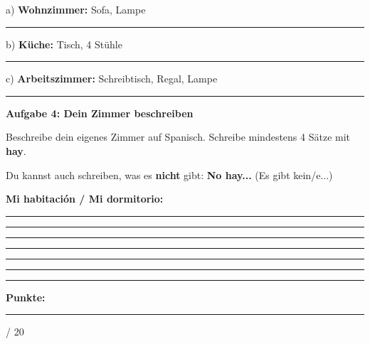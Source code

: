 \documentclass[11pt, a4paper]{article}
\newcommand{\fachfarbe}{spanisch}
\newcommand{\maxpunkte}{20}
\newcommand{\punktebox}[1]{\hfill\fbox{\small \_/#1}}
\newcommand{\luecke}[1]{\rule{#1}{0.4pt}}
\newenvironment{aufgabe}[1]{%
    \needspace{5\baselineskip}%
    \nopagebreak[4]%
    \vspace{10pt}
    \noindent\textbf{\textcolor{\fachfarbe}{Aufgabe #1}}
    \nopagebreak[4]%
    \vspace{5pt}
    \nopagebreak[4]%
    \begin{list}{}{\leftmargin=0pt}
    \item[]
}{%
    \end{list}
}
\newcommand{\es}[1]{\textcolor{\fachfarbe}{\textbf{#1}}}
\begin{document}
\noindent
a) \textbf{Wohnzimmer:} Sofa, Lampe

\vspace{0.5em}
\noindent
\rule{\textwidth}{0.4pt}

\vspace{1em}

\noindent
b) \textbf{Küche:} Tisch, 4 Stühle

\vspace{0.5em}
\noindent
\rule{\textwidth}{0.4pt}

\vspace{1em}

\noindent
c) \textbf{Arbeitszimmer:} Schreibtisch, Regal, Lampe

\vspace{0.5em}
\noindent
\rule{\textwidth}{0.4pt}

\vspace{15pt}


\begin{aufgabe}{4: Dein Zimmer beschreiben}
Beschreibe dein eigenes Zimmer auf Spanisch. Schreibe mindestens 4 Sätze mit \es{hay}. \punktebox{6}
\end{aufgabe}

\begin{hinweis}
Du kannst auch schreiben, was es \textbf{nicht} gibt: \es{No hay...} (Es gibt kein/e...)
\end{hinweis}

\vspace{0.8em}

\noindent
\textbf{Mi habitación / Mi dormitorio:}

\vspace{0.8em}
\noindent
\rule{\textwidth}{0.4pt}

\vspace{0.8em}
\noindent
\rule{\textwidth}{0.4pt}

\vspace{0.8em}
\noindent
\rule{\textwidth}{0.4pt}

\vspace{0.8em}
\noindent
\rule{\textwidth}{0.4pt}

\vspace{0.8em}
\noindent
\rule{\textwidth}{0.4pt}

\vspace{0.8em}
\noindent
\rule{\textwidth}{0.4pt}


\vspace{20pt}
\hrule
\vspace{10pt}

\begin{flushright}
\textbf{Punkte:} \luecke{1cm} / \maxpunkte
\end{flushright}
\end{document}
